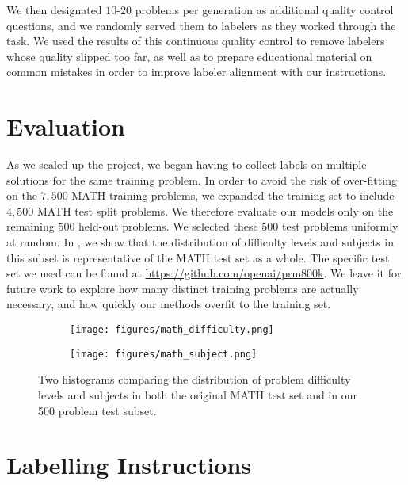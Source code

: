 \documentclass{article}
\begin{document}
We then designated $10$-$20$ problems per generation as additional quality control questions, and we randomly served them to labelers as they worked through the task. We used the results of this continuous quality control to remove labelers whose quality slipped too far, as well as to prepare educational material on common mistakes in order to improve labeler alignment with our instructions.

\section{Evaluation} \label{appendix:evaluation}

As we scaled up the project, we began having to collect labels on multiple solutions for the same training problem. In order to avoid the risk of over-fitting on the $7,\!500$ MATH training problems, we expanded the training set to include $4,\!500$ MATH test split problems. We therefore evaluate our models only on the remaining $500$ held-out problems. We selected these $500$ test problems uniformly at random. In , we show that the distribution of difficulty levels and subjects in this subset is representative of the MATH test set as a whole. The specific test set we used can be found at \href{https://github.com/openai/prm800k}{https://github.com/openai/prm800k}. We leave it for future work to explore how many distinct training problems are actually necessary, and how quickly our methods overfit to the training set.


\begin{figure}[!h]
\centering
\begin{subfigure}{0.475 \textwidth}
\texttt{[image: figures/math\_difficulty.png]}
\vspace{.7cm}
\end{subfigure}
\hspace*{\fill}
\begin{subfigure}{0.475 \textwidth}
\texttt{[image: figures/math\_subject.png]}
\end{subfigure}
\caption{Two histograms comparing the distribution of problem difficulty levels and subjects in both the original MATH test set and in our 500 problem test subset.}
\label{figure:math_histogram}
\end{figure}

\newpage

\section{Labelling Instructions} \label{appendix:labelling_instructions}
\end{document}
